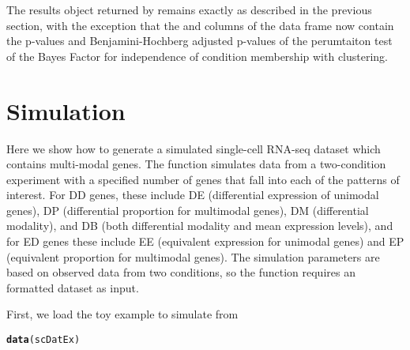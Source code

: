 \documentclass{article}\usepackage[]{graphicx}\usepackage[]{color}
\makeatletter
\newcommand{\hlstd}[1]{\textcolor[rgb]{0.345,0.345,0.345}{#1}}%
\newcommand{\hlkwd}[1]{\textcolor[rgb]{0.737,0.353,0.396}{\textbf{#1}}}%
\newenvironment{kframe}{%
 \def\at@end@of@kframe{}%
 \ifinner\ifhmode%
  \def\at@end@of@kframe{\end{minipage}}%
  \begin{minipage}{\columnwidth}%
 \fi\fi%
 \def\FrameCommand##1{\hskip\@totalleftmargin \hskip-\fboxsep
 \colorbox{shadecolor}{##1}\hskip-\fboxsep
     \hskip-\linewidth \hskip-\@totalleftmargin \hskip\columnwidth}%
 \MakeFramed {\advance\hsize-\width
   \@totalleftmargin\z@ \linewidth\hsize
   \@setminipage}}%
 {\par\unskip\endMakeFramed%
 \at@end@of@kframe}
\newenvironment{knitrout}{}{} %
\makeatother
\begin{document}
The results object returned by  remains exactly as described in the previous section, with the exception that the  and  columns of the  data frame now contain the p-values and Benjamini-Hochberg adjusted p-values of the perumtaiton test of the Bayes Factor for independence of condition membership with clustering. 

\section{Simulation}

Here we show how to generate a simulated single-cell RNA-seq dataset which contains multi-modal genes.  The  function simulates data from a two-condition experiment with a specified number of genes that fall into each of the patterns of interest.  For DD genes, these include DE (differential expression of unimodal genes), DP (differential proportion for multimodal genes), DM (differential modality), and DB (both differential modality and mean expression levels), and for ED genes these include EE (equivalent expression for unimodal genes) and EP (equivalent proportion for multimodal genes).  The simulation parameters are based on observed data from two conditions, so the function requires an  formatted dataset as input.

First, we load the toy example  to simulate from
\begin{knitrout}
\color{fgcolor}\begin{kframe}
\begin{alltt}
\hlkwd{data}\hlstd{(scDatEx)}
\end{alltt}
\end{kframe}
\end{knitrout}
\end{document}
